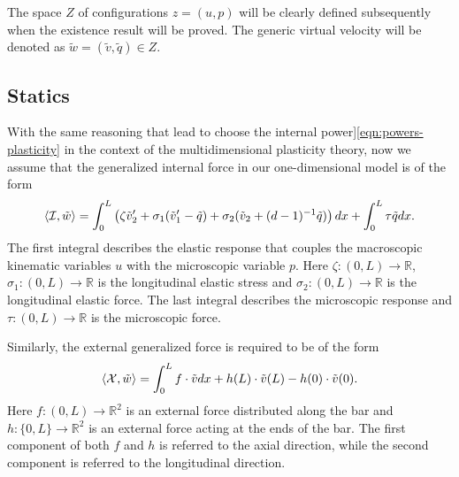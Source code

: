 \documentclass[a4paper,10pt,twoside]{amsbook}
\numberwithin{section}{chapter}
\numberwithin{equation}{chapter}
\theoremstyle{definition}
\DeclarePairedDelimiter{\dual}{\langle}{\rangle}
\begin{document}
The space $Z$ of configurations $z=(u,p)$ will be clearly defined subsequently when the existence result will be proved. The generic virtual velocity will be denoted as $\tilde w=(\tilde v,\tilde q)\in Z$.

\subsection{Statics}

With the same reasoning that lead to choose the internal power]\eqref{eqn:powers-plasticity} in the context of the multidimensional plasticity theory, now we assume that the generalized internal force in our one-dimensional model is of the form
\[
\dual{\mathcal I,\tilde w}=\int_0^L\left(\zeta\tilde v_2'+\sigma_1(\tilde v_1'-\tilde q)+\sigma_2(\tilde v_2+(d-1)^{-1}\tilde q)\right)dx+\int_0^L\tau\tilde qdx.
\]
The first integral describes the elastic response that couples the macroscopic kinematic variables $u$ with the microscopic variable $p$. Here $\zeta\colon(0,L)\to\mathbb{R}$, $\sigma_1\colon(0,L)\to\mathbb{R}$ is the longitudinal elastic stress and $\sigma_2\colon(0,L)\to\mathbb{R}$ is the longitudinal elastic force. The last integral describes the microscopic response and $\tau\colon(0,L)\to\mathbb{R}$ is the microscopic force.

Similarly, the external generalized force is required to be of the form
\[
\dual{\mathcal X,\tilde w}=\int_0^Lf\cdot\tilde vdx+h(L)\cdot\tilde v(L)-h(0)\cdot\tilde v(0).
\]
Here $f\colon(0,L)\to\mathbb{R}^2$ is an external force distributed along the bar and $h\colon\{0,L\}\to\mathbb{R}^2$ is an external force acting at the ends of the bar. The first component of both $f$ and $h$ is referred to the axial direction, while the second component is referred to the longitudinal direction.
\end{document}
